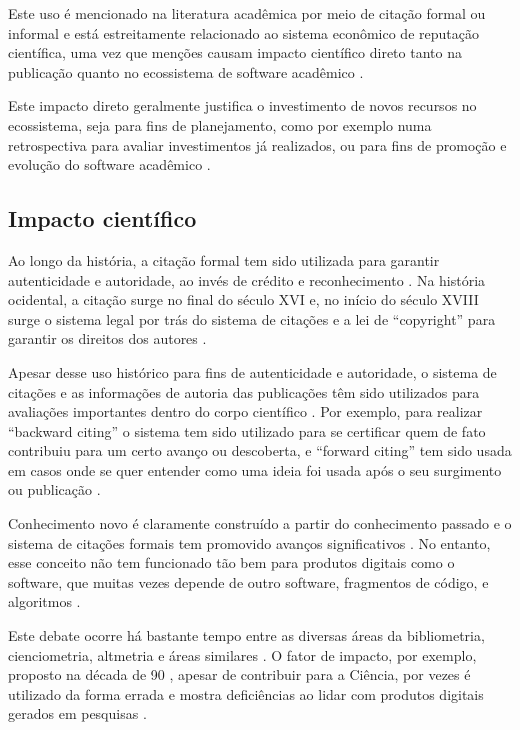 Este uso é mencionado na literatura acadêmica por meio de citação formal ou informal
\cite{smith2016software} e está estreitamente relacionado ao sistema
econômico de reputação científica, uma vez que
menções causam
impacto científico direto tanto na publicação quanto no ecossistema de software
acadêmico \cite{katz2014transitive}.

Este impacto direto geralmente justifica o investimento de novos recursos no
ecossistema, seja para fins de planejamento, como por exemplo numa retrospectiva para avaliar
investimentos já realizados, ou para fins de promoção e evolução do software acadêmico
\cite{howison2015understanding}.

\subsection{Impacto científico}

Ao longo da história, a citação formal tem sido utilizada para garantir
autenticidade e autoridade, ao invés de crédito e reconhecimento
\cite{katz2014transitive}.
Na história ocidental, a citação surge no final do século XVI e, no início do
século XVIII surge o sistema legal por trás do sistema de citações e a lei de
``copyright'' para garantir os direitos dos autores \cite{katz2014transitive}.

Apesar desse uso histórico para fins de autenticidade e autoridade, o sistema de
citações e as informações de autoria das publicações têm sido
utilizados para avaliações importantes dentro do corpo científico
\cite{katz2014transitive}.
Por exemplo, para realizar ``backward citing'' o sistema tem sido utilizado para se certificar quem de
fato contribuiu para um certo avanço ou descoberta, e ``forward citing'' tem
sido usada em casos onde se quer entender como uma ideia foi usada após o seu
surgimento ou publicação \cite{katz2014transitive}.

Conhecimento novo é claramente construído a partir do conhecimento passado e o
sistema de citações formais tem promovido avanços significativos
\cite{katz2014transitive}.
No entanto, esse conceito não tem funcionado tão bem para produtos digitais
como o software, que muitas vezes depende de outro software, fragmentos de
código, e algoritmos \cite{katz2014transitive}.

Este debate ocorre há bastante tempo entre as diversas áreas da bibliometria,
cienciometria, altmetria e áreas similares \cite{gouveia2013altmetria}.  O
fator de impacto, por exemplo, proposto na década de 90
\cite{reuters2017history}, apesar de contribuir para a Ciência, por vezes é
utilizado da forma errada e mostra deficiências ao lidar com produtos digitais
gerados em pesquisas \cite{katz2014transitive}.

